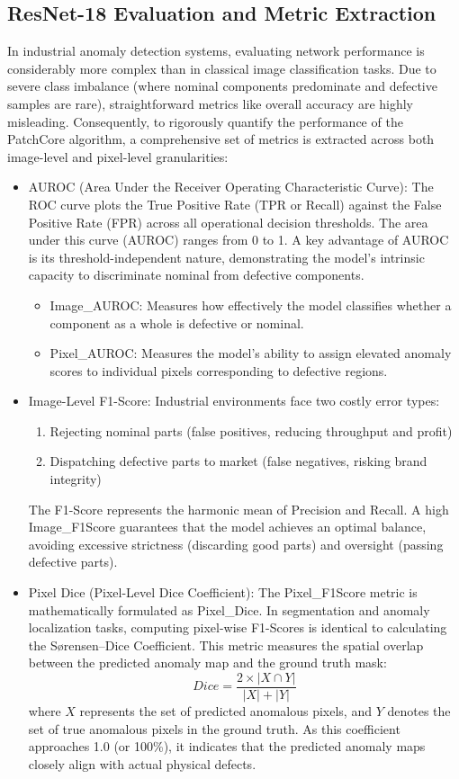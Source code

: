 \documentclass{article}
\begin{document}
\subsection{ResNet-18 Evaluation and Metric Extraction}

In industrial anomaly detection systems, evaluating network performance is considerably more complex than in classical image classification tasks. Due to severe class imbalance (where nominal components predominate and defective samples are rare), straightforward metrics like overall accuracy are highly misleading. Consequently, to rigorously quantify the performance of the PatchCore algorithm, a comprehensive set of metrics is extracted across both image-level and pixel-level granularities:

\begin{itemize}
	\item AUROC (Area Under the Receiver Operating Characteristic Curve): The ROC curve plots the True Positive Rate (TPR or Recall) against the False Positive Rate (FPR) across all operational decision thresholds. The area under this curve (AUROC) ranges from 0 to 1. A key advantage of AUROC is its threshold-independent nature, demonstrating the model's intrinsic capacity to discriminate nominal from defective components.
	\begin{itemize}
		\item Image\_AUROC: Measures how effectively the model classifies whether a component as a whole is defective or nominal.
		\item Pixel\_AUROC: Measures the model's ability to assign elevated anomaly scores to individual pixels corresponding to defective regions.
	\end{itemize}	\item Image-Level F1-Score: Industrial environments face two costly error types:
	\begin{enumerate}
		\item Rejecting nominal parts (false positives, reducing throughput and profit)
		\item Dispatching defective parts to market (false negatives, risking brand integrity)
	\end{enumerate}
	The F1-Score represents the harmonic mean of Precision and Recall. A high Image\_F1Score guarantees that the model achieves an optimal balance, avoiding excessive strictness (discarding good parts) and oversight (passing defective parts).
	
	\item Pixel Dice (Pixel-Level Dice Coefficient): The Pixel\_F1Score metric is mathematically formulated as Pixel\_Dice. In segmentation and anomaly localization tasks, computing pixel-wise F1-Scores is identical to calculating the Sørensen–Dice Coefficient. This metric measures the spatial overlap between the predicted anomaly map and the ground truth mask:
	$$Dice = \frac{2 \times |X \cap Y|}{|X| + |Y|}$$
	where $X$ represents the set of predicted anomalous pixels, and $Y$ denotes the set of true anomalous pixels in the ground truth. As this coefficient approaches 1.0 (or 100\%), it indicates that the predicted anomaly maps closely align with actual physical defects.
\end{itemize}
\end{document}
